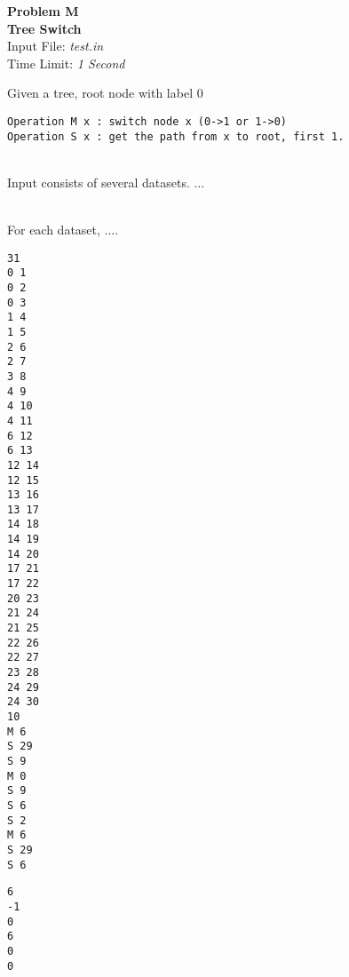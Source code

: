 \documentclass[12pt,psfig,epsf]{article}
\begin{document}
\begin{center}
   {\Large\bfseries Problem M}\\			%
   {\large\bf Tree Switch}\\			%
   {\large Input File: {\em test.in}}\\		%
   {\large Time Limit: {\em 1 Second}}\\	%
\end{center}



Given a tree, root node with label 0

\begin{verbatim}
Operation M x : switch node x (0->1 or 1->0)
Operation S x : get the path from x to root, first 1.
\end{verbatim}



\vspace*{.3in} \\

Input consists of several datasets.  ...

\vspace*{.3in} \\

For each dataset, ....

\vspace*{.3in}  
\begin{verbatim}
31
0 1
0 2
0 3
1 4
1 5
2 6 
2 7
3 8
4 9
4 10
4 11
6 12
6 13
12 14
12 15
13 16
13 17
14 18
14 19
14 20
17 21
17 22
20 23
21 24
21 25
22 26
22 27
23 28
24 29
24 30
10
M 6
S 29
S 9
M 0
S 9
S 6
S 2
M 6
S 29
S 6
\end{verbatim}

\vspace*{.3in} 
\begin{verbatim}
6
-1
0
6
0
0
\end{verbatim}
\end{document}
